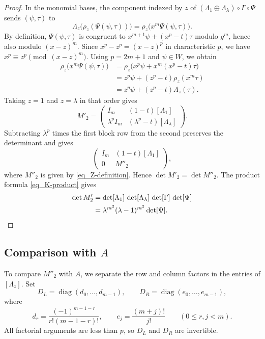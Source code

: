 \documentclass{amsart}
\numberwithin{equation}{section}
\begin{document}
\begin{proof}
In the monomial bases, the component indexed by $z$
of $(\Lambda_1\oplus \Lambda_\lambda)\circ\Gamma\circ \Psi$ sends
$(\psi,\tau)$ to
\[
  \Lambda_z\bigl(\rho_z(\Psi(\psi,\tau))\bigr)
    =\rho_z\bigl(x^m\Psi(\psi,\tau)\bigr).
\]
By definition, $\Psi(\psi,\tau)$ is congruent to
$x^{m+1}\psi+(x^p-t)\tau$ modulo $g^m$, hence also modulo
$(x-z)^m$. Since $x^p-z^p=(x-z)^p$ in characteristic
$p$, we have $x^p\equiv z^p\pmod{(x-z)^m}$. Using
$p=2m+1$ and $\psi\in W$, we obtain
\begin{align*}
  \rho_z\bigl(x^m\Psi(\psi,\tau)\bigr)
    &=\rho_z\bigl(x^p\psi+x^m(x^p-t)\tau\bigr)\\
    &=z^p\psi+(z^p-t)\rho_z(x^m\tau)\\
    &=z^p\psi+(z^p-t)\Lambda_z(\tau).
\end{align*}
Taking $z=1$ and $z=\lambda$ in that order gives
\[
  M'_2=
  \begin{pmatrix}
    I_m & (1-t)[\Lambda_1]\\
    \lambda^p I_m & (\lambda^p-t)[\Lambda_\lambda]
  \end{pmatrix}.
\]
Subtracting $\lambda^p$ times the first block row from
the second preserves the determinant and gives
\[
  \begin{pmatrix}
    I_m & (1-t)[\Lambda_1]\\
    0 & M''_2
  \end{pmatrix},
\]
where $M''_2$ is given by \eqref{eq_Z-definition}. Hence
$\det M'_2=\det M''_2$. The product formula
\eqref{eq_K-product} gives 
\begin{align*}
  \det M'_2
    &=\det[\Lambda_1]\,\det[\Lambda_\lambda]\,\det[\Gamma]\,\det[\Psi]\\
    &=\lambda^{m^2}(\lambda-1)^{m^2}\det[\Psi]. \qedhere
\end{align*}
\end{proof}

\subsection{Comparison with \texorpdfstring{$A$}{A}}
\label{subsec_comparison-A}

To compare $M''_2$ with $A$, we separate the row and column
factors in the entries of $[\Lambda_z]$. Set
\[
  D_L=\operatorname{diag}(d_0,\ldots,d_{m-1}),
  \qquad
  D_R=\operatorname{diag}(e_0,\ldots,e_{m-1}),
\]
where
\[
  d_r=\frac{(-1)^{m-1-r}}{r!(m-1-r)!},
  \qquad
  e_j=\frac{(m+j)!}{j!}
  \qquad (0\le r,j<m).
\]
All factorial arguments are less than $p$, so $D_L$
and $D_R$ are invertible.
\end{document}
